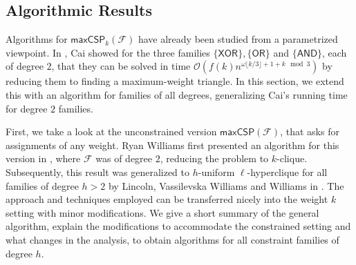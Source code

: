 \documentclass[a4paper,UKenglish,cleveref, autoref, thm-restate,numberwithinsect]{lipics-v2021}
\newcommand{\bigO}{\mathcal{O}}
\newcommand{\maxcspk}{\textsf{maxCSP}_{k}}
\newcommand{\maxcsp}{\textsf{maxCSP}}
\newcommand{\Fam}{\mathcal{F}}
\newcommand{\AND}{\textsf{AND}\xspace}
\newcommand{\xor}{\textsf{XOR}\xspace}
\newcommand{\OR}{\textsf{OR}\xspace}
\begin{document}
\subsection{Algorithmic Results}
Algorithms for $\maxcspk(\Fam)$ have already been studied from a parametrized viewpoint. In \cite{Cai08}, Cai showed for the three families $\{\xor\},\{\OR\}$ and $\{\AND\}$, each of degree $2$,
that they can be solved in time $\bigO(f(k) n^{\omega \lfloor k/3 \rfloor + 1 + k \mod 3})$ by reducing them to finding a maximum-weight triangle. 
In this section, we extend this with an algorithm for families of all degrees, generalizing Cai's running time for degree $2$ families.

First, we take a look at the unconstrained version $\maxcsp(\Fam)$, that asks for assignments of any weight.
Ryan Williams first presented an algorithm for this version in \cite{Wil07}, where $\Fam$ was of degree $2$, reducing the problem to $k$-clique.
Subsequently, this result was generalized to $h$-uniform $\ell$-hyperclique for all families of degree $h>2$ by Lincoln, {Vassilevska Williams} and Williams in \cite{LincolnWW18}.
The approach and techniques employed can be transferred nicely into the weight $k$ setting with minor modifications.
We give a short summary of the general algorithm, explain the modifications to accommodate the constrained setting and what changes in the analysis, 
to obtain algorithms for all constraint families of degree $h$.
\end{document}
